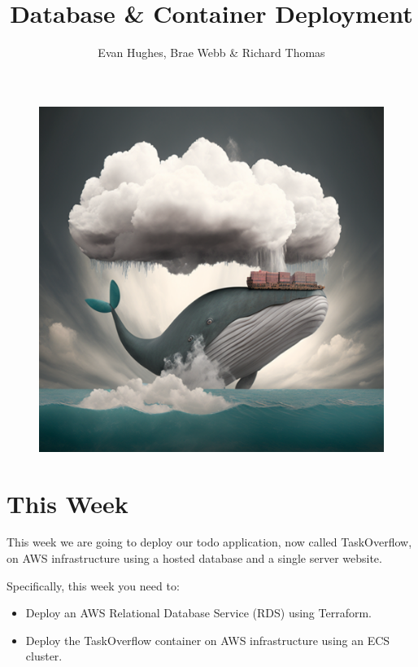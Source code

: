 \documentclass{csse4400}
\title{Database \& Container Deployment}
\author{Evan Hughes, Brae Webb \& Richard Thomas}
\date{\week[practical]{5}}
\begin{document}
\maketitle

\begin{figure}[h]
  \begin{center}
    \includegraphics[scale=0.4]{images/cloud-whale}
  \end{center}
\end{figure}


\section{This Week}
This week we are going to deploy our todo application,
now called TaskOverflow,
on AWS infrastructure using a hosted database and a single server website.

Specifically, this week you need to:
\begin{itemize}
    \item Deploy an AWS Relational Database Service (RDS) using Terraform.
    \item Deploy the TaskOverflow container on AWS infrastructure using an ECS cluster.
\end{itemize}
\end{document}
